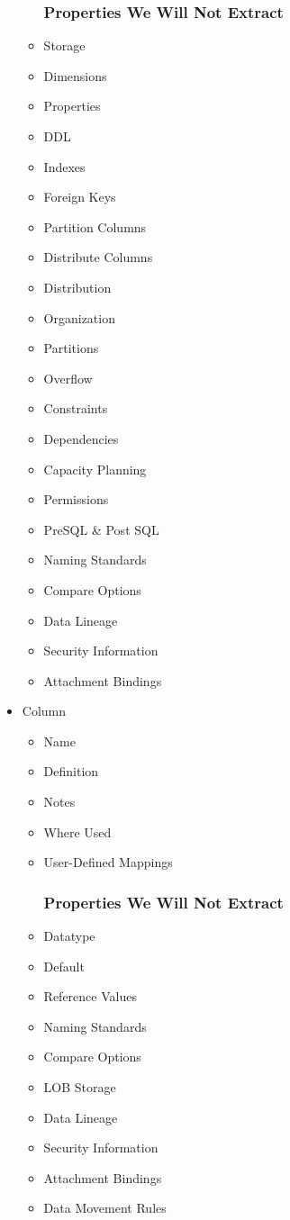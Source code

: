 \documentclass[12pt,a4paper]{report}
\begin{document}
\begin{itemize}
\begin{itemize}
		\subsubsection{Properties We Will Not Extract}
		\item Storage
		\item Dimensions
		\item Properties
		\item DDL
		\item Indexes
		\item Foreign Keys
		\item Partition Columns
		\item Distribute Columns
		\item Distribution
		\item Organization
		\item Partitions
		\item Overflow
		\item Constraints
		\item Dependencies
		\item Capacity Planning
		\item Permissions
		\item PreSQL \& Post SQL
		\item Naming Standards
		\item Compare Options
		\item Data Lineage
		\item Security Information
		\item Attachment Bindings
	\end{itemize}
	\item Column
	\begin{itemize}
		\item Name
		\item Definition
		\item Notes
		\item Where Used
		\item User-Defined Mappings
		\subsubsection{Properties We Will Not Extract}
		\item Datatype
		\item Default
		\item Reference Values
		\item Naming Standards
		\item Compare Options
		\item LOB Storage
		\item Data Lineage
		\item Security Information
		\item Attachment Bindings
		\item Data Movement Rules
	\end{itemize}

\end{itemize}
\end{document}
